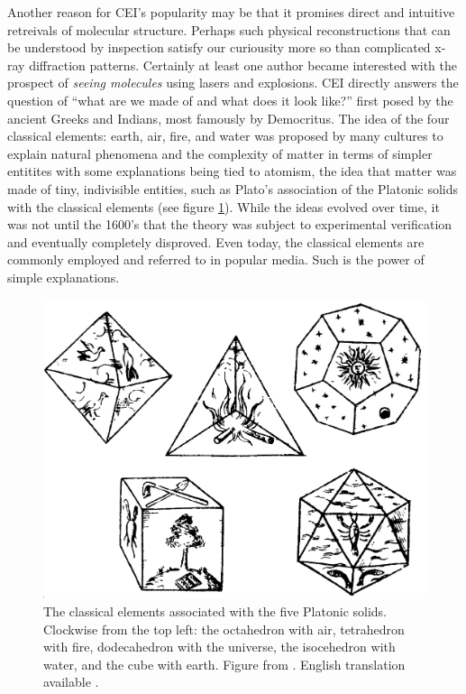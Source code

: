 Another reason for CEI's popularity may be that it promises direct and intuitive retreivals of molecular structure. Perhaps such physical reconstructions that can be understood by inspection satisfy our curiousity more so than complicated x-ray diffraction patterns. Certainly at least one author became interested with the prospect of \emph{seeing molecules} using lasers and explosions. CEI directly answers the question of ``what are we made of and what does it look like?'' first posed by the ancient Greeks and Indians, most famously by Democritus. The idea of the four classical elements: earth, air, fire, and water was proposed by many cultures to explain natural phenomena and the complexity of matter in terms of simpler entitites with some explanations being tied to atomism, the idea that matter was made of tiny, indivisible entities, such as Plato's association of the Platonic solids with the classical elements (see figure \ref{fig:platonicSolids}). While the ideas evolved over time, it was not until the 1600's that the theory was subject to experimental verification and eventually completely disproved. Even today, the classical elements are commonly employed and referred to in popular media. Such is the power of simple explanations.

\begin{figure}
  \centering
  \includegraphics[width=\textwidth]{gfx/PlatonicSolids}
  \caption[The classical elements associated with the five Platonic solids.]
  {The classical elements associated with the five Platonic solids. Clockwise from the top left: the octahedron with air, tetrahedron with fire, dodecahedron with the universe, the isocehedron with water, and the cube with earth. Figure from \citet[Book 2, p. 53]{Kepler1619}. English translation available \citep{Kepler97}.}
  \label{fig:platonicSolids}
\end{figure}

